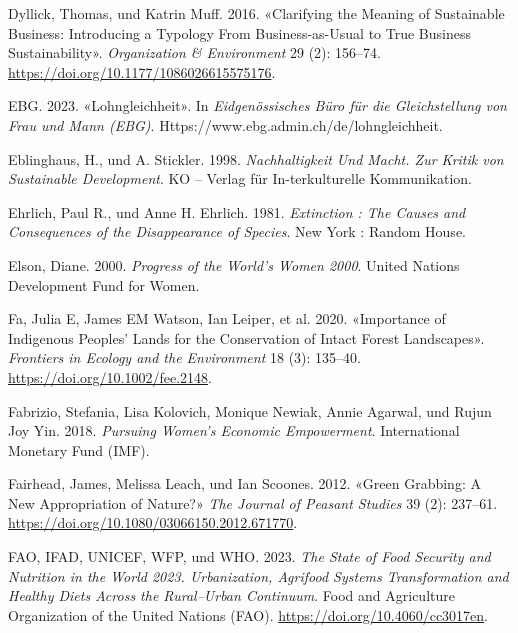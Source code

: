\documentclass[
  nswissgerman,
  a4paper,
  DIV=11,
  numbers=noendperiod,
  oneside,
  openany]{scrreprt}
\newlength{\cslhangindent}
\newenvironment{CSLReferences}[2] %
 {\begin{list}{}{%
  \setlength{\itemindent}{0pt}
  \setlength{\leftmargin}{0pt}
  \setlength{\parsep}{0pt}
  \ifodd #1
   \setlength{\leftmargin}{\cslhangindent}
   \setlength{\itemindent}{-1\cslhangindent}
  \fi
  \setlength{\itemsep}{#2\baselineskip}}}
 {\end{list}}
\begin{document}
\begin{CSLReferences}{1}{1}
Dyllick, Thomas, und Katrin Muff. 2016. {«Clarifying the {Meaning} of
{Sustainable Business}: {Introducing} a {Typology From
Business-as-Usual} to {True Business Sustainability}»}.
\emph{Organization \& Environment} 29 (2): 156--74.
\url{https://doi.org/10.1177/1086026615575176}.

EBG. 2023. {«Lohngleichheit»}. In \emph{Eidgen{ö}ssisches B{ü}ro f{ü}r
die Gleichstellung von Frau und Mann (EBG)}.
Https://www.ebg.admin.ch/de/lohngleichheit.

Eblinghaus, H., und A. Stickler. 1998. \emph{Nachhaltigkeit Und {Macht}.
{Zur Kritik} von {Sustainable Development}}. KO -- Verlag für
In-terkulturelle Kommunikation.

Ehrlich, Paul R., und Anne H. Ehrlich. 1981. \emph{Extinction : The
Causes and Consequences of the Disappearance of Species}. New York :
Random House.

Elson, Diane. 2000. \emph{Progress of the World's Women 2000}. United
Nations Development Fund for Women.

Fa, Julia E, James EM Watson, Ian Leiper, et al. 2020. {«Importance of
{Indigenous Peoples}' Lands for the Conservation of {Intact Forest
Landscapes}»}. \emph{Frontiers in Ecology and the Environment} 18 (3):
135--40. \url{https://doi.org/10.1002/fee.2148}.

Fabrizio, Stefania, Lisa Kolovich, Monique Newiak, Annie Agarwal, und
Rujun Joy Yin. 2018. \emph{Pursuing {Women}'s {Economic Empowerment}}.
International Monetary Fund (IMF).

Fairhead, James, Melissa Leach, und Ian Scoones. 2012. {«Green
{Grabbing}: A New Appropriation of Nature?»} \emph{The Journal of
Peasant Studies} 39 (2): 237--61.
\url{https://doi.org/10.1080/03066150.2012.671770}.

FAO, IFAD, UNICEF, WFP, und WHO. 2023. \emph{The {State} of {Food
Security} and {Nutrition} in the {World} 2023. {Urbanization}, Agrifood
Systems Transformation and Healthy Diets Across the Rural--Urban
Continuum}. {Food and Agriculture Organization of the United Nations
(FAO)}. \url{https://doi.org/10.4060/cc3017en}.


\end{CSLReferences}
\end{document}

